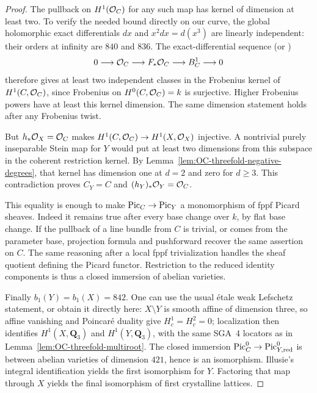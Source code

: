 \begin{proof}
The pullback on $H^1(\mathcal O_C)$ for any such map has kernel of dimension at least two.  To verify the needed bound directly on our curve, the global holomorphic exact differentials $dx$ and $x^2dx=d(x^3)$ are linearly independent: their orders at infinity are $840$ and $836$.  The exact-differential sequence (or \cite[Theorem~1 at $D=0$]{Mukai2011Kodaira})
\[
 0\longrightarrow\mathcal O_C\longrightarrow F_*\mathcal O_C
                    \longrightarrow B_C^1\longrightarrow0
\]
therefore gives at least two independent classes in the Frobenius kernel of $H^1(C,\mathcal O_C)$, since Frobenius on $H^0(C,\mathcal O_C)=k$ is surjective.  Higher Frobenius powers have at least this kernel dimension.  The same dimension statement holds after any Frobenius twist.

But $h_*\mathcal O_X=\mathcal O_C$ makes $H^1(C,\mathcal O_C)\to H^1(X,\mathcal O_X)$ injective.  A nontrivial purely inseparable Stein map for $Y$ would put at least two dimensions from this subspace in the coherent restriction kernel.  By Lemma~\ref{lem:OC-threefold-negative-degrees}, that kernel has dimension one at $d=2$ and zero for $d\geq3$.  This contradiction proves $C_Y=C$ and $(h_Y)_*\mathcal O_Y=\mathcal O_C$.

This equality is enough to make $\operatorname{Pic}_C\to\operatorname{Pic}_Y$ a monomorphism of fppf Picard sheaves.  Indeed it remains true after every base change over $k$, by flat base change.  If the pullback of a line bundle from $C$ is trivial, or comes from the parameter base, projection formula and pushforward recover the same assertion on $C$.  The same reasoning after a local fppf trivialization handles the sheaf quotient defining the Picard functor.  Restriction to the reduced identity components is thus a closed immersion of abelian varieties.

Finally $b_1(Y)=b_1(X)=842$.  One can use the usual \'etale weak Lefschetz statement, or obtain it directly here: $X\setminus Y$ is smooth affine of dimension three, so affine vanishing and Poincar\'e duality give $H_c^1=H_c^2=0$; localization then identifies $H^1(X,\mathbf Q_3)$ and $H^1(Y,\mathbf Q_3)$, with the same SGA~4 locators as in Lemma~\ref{lem:OC-threefold-multiroot}.  The closed immersion $\operatorname{Pic}_C^0\to\operatorname{Pic}^0_{Y,\mathrm{red}}$ is between abelian varieties of dimension $421$, hence is an isomorphism.  Illusie's integral identification yields the first isomorphism for $Y$.  Factoring that map through $X$ yields the final isomorphism of first crystalline lattices.
\end{proof}

